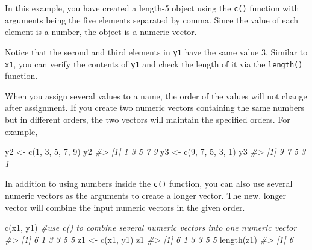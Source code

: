 \documentclass[
]{book}
\newenvironment{Shaded}{\begin{snugshade}}{\end{snugshade}}
\newcommand{\CommentTok}[1]{\textcolor[rgb]{0.56,0.35,0.01}{\textit{#1}}}
\newcommand{\DecValTok}[1]{\textcolor[rgb]{0.00,0.00,0.81}{#1}}
\newcommand{\FunctionTok}[1]{\textcolor[rgb]{0.00,0.00,0.00}{#1}}
\newcommand{\NormalTok}[1]{#1}
\newcommand{\OtherTok}[1]{\textcolor[rgb]{0.56,0.35,0.01}{#1}}
\newenvironment{blackbox}{
  \definecolor{shadecolor}{rgb}{0, 0, 0}  %
  \color{white}
  \begin{shaded}}
 {\end{shaded}}
\newenvironment{infobox}[1]
  {
  \begin{itemize}
  \renewcommand{\labelitemi}{
    \raisebox{-.7\height}[0pt][0pt]{
      {\setkeys{Gin}{width=3em,keepaspectratio}
        \texttt{[image: pics/\#1]}}
    }
  }
  \setlength{\fboxsep}{1em}
  \begin{blackbox}
  \item
  }
  {
  \end{blackbox}
  \end{itemize}
  }
\begin{document}
In this example, you have created a length-5 object using the \texttt{c()} function with arguments being the five elements separated by comma. Since the value of each element is a number, the object is a numeric vector.

Notice that the second and third elements in \texttt{y1} have the same value 3. Similar to \texttt{x1}, you can verify the contents of \texttt{y1} and check the length of it via the \texttt{length()} function.

\begin{infobox}{caution}

When you assign several values to a name, the order of the values will not change after assignment. If you create two numeric vectors containing the same numbers but in different orders, the two vectors will maintain the specified orders. For example,

\begin{Shaded}
\begin{Highlighting}[]
\NormalTok{y2 }\OtherTok{\textless{}{-}} \FunctionTok{c}\NormalTok{(}\DecValTok{1}\NormalTok{, }\DecValTok{3}\NormalTok{, }\DecValTok{5}\NormalTok{, }\DecValTok{7}\NormalTok{, }\DecValTok{9}\NormalTok{)    }
\NormalTok{y2                        }
\CommentTok{\#\textgreater{} [1] 1 3 5 7 9}
\NormalTok{y3 }\OtherTok{\textless{}{-}} \FunctionTok{c}\NormalTok{(}\DecValTok{9}\NormalTok{, }\DecValTok{7}\NormalTok{, }\DecValTok{5}\NormalTok{, }\DecValTok{3}\NormalTok{, }\DecValTok{1}\NormalTok{)    }
\NormalTok{y3}
\CommentTok{\#\textgreater{} [1] 9 7 5 3 1}
\end{Highlighting}
\end{Shaded}

\end{infobox}

In addition to using numbers inside the \texttt{c()} function, you can also use several numeric vectors as the arguments to create a longer vector. The new. longer vector will combine the input numeric vectors in the given order.

\begin{Shaded}
\begin{Highlighting}[]
\FunctionTok{c}\NormalTok{(x1, y1)          }\CommentTok{\#use c() to combine several numeric vectors into one numeric vector}
\CommentTok{\#\textgreater{} [1] 6 1 3 3 5 5}
\NormalTok{z1 }\OtherTok{\textless{}{-}} \FunctionTok{c}\NormalTok{(x1, y1)}
\NormalTok{z1}
\CommentTok{\#\textgreater{} [1] 6 1 3 3 5 5}
\FunctionTok{length}\NormalTok{(z1)}
\CommentTok{\#\textgreater{} [1] 6}
\end{Highlighting}
\end{Shaded}
\end{document}
